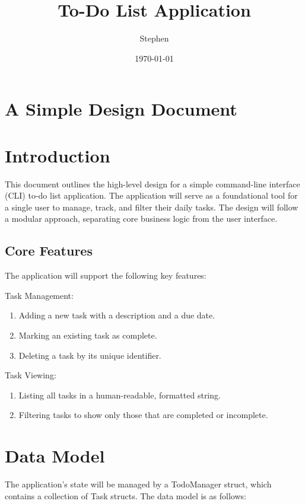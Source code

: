\documentclass[11pt]{article}
\author{Stephen}
\date{\today}
\title{To-Do List Application}
\begin{document}
\maketitle

\tableofcontents

\pagebreak
\section{ A Simple Design Document}
\label{sec:org72ed0f9}

\section{Introduction}
\label{sec:org65bcd96}

This document outlines the high-level design for a simple command-line interface (CLI) to-do list application.
The application will serve as a foundational tool for a single user to manage, track, and filter their daily tasks.
The design will follow a modular approach, separating core business logic from the user interface.
\subsection{Core Features}
\label{sec:org29f956b}

The application will support the following key features:

Task Management:
\begin{enumerate}
\item Adding a new task with a description and a due date.
\item Marking an existing task as complete.
\item Deleting a task by its unique identifier.
\end{enumerate}

Task Viewing:
\begin{enumerate}
\item Listing all tasks in a human-readable, formatted string.
\item Filtering tasks to show only those that are completed or incomplete.
\end{enumerate}
\section{Data Model}
\label{sec:orgb19c8a8}

The application's state will be managed by a TodoManager struct, which contains a collection of Task structs.
The data model is as follows:
\end{document}
